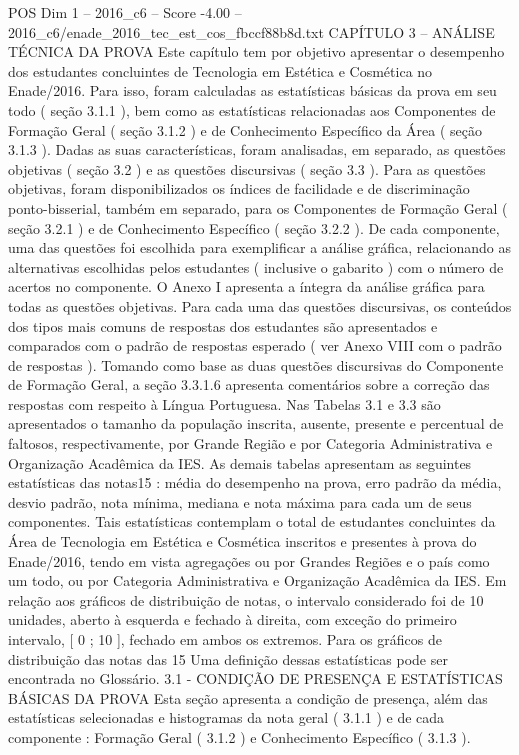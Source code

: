 \begin{textsample}{POS Dim 1 – 2016\_c6 – Score -4.00 – 2016\_c6/enade\_2016\_tec\_est\_cos\_fbccf88b8d.txt}  \label{ex:f1_pos_398}
CAPÍTULO 3 – ANÁLISE TÉCNICA DA PROVA Este capítulo tem por objetivo apresentar o desempenho dos estudantes concluintes de Tecnologia em Estética e Cosmética no Enade/2016.
Para isso, foram calculadas as estatísticas básicas da prova em seu todo ( seção 3.1.1 ), bem como as estatísticas relacionadas aos Componentes de Formação Geral ( seção 3.1.2 ) e de Conhecimento Específico da Área ( seção 3.1.3 ).
Dadas as suas características, foram analisadas, em separado, as questões objetivas ( seção 3.2 ) e as questões discursivas ( seção 3.3 ).
Para as questões objetivas, foram disponibilizados os índices de facilidade e de discriminação ponto-bisserial, também em separado, para os Componentes de Formação Geral ( seção 3.2.1 ) e de Conhecimento Específico ( seção 3.2.2 ).
De cada componente, uma das questões foi escolhida para exemplificar a análise gráfica, relacionando as alternativas escolhidas pelos estudantes ( inclusive o gabarito ) com o número de acertos no componente.
O Anexo I apresenta a íntegra da análise gráfica para todas as questões objetivas.
Para cada uma das questões discursivas, os conteúdos dos tipos mais comuns de respostas dos estudantes são apresentados e comparados com o padrão de respostas esperado ( ver Anexo VIII com o padrão de respostas ).
Tomando como base as duas questões discursivas do Componente de Formação Geral, a seção 3.3.1.6 apresenta comentários sobre a correção das respostas com respeito à Língua Portuguesa.
Nas Tabelas 3.1 e 3.3 são apresentados o tamanho da população inscrita, ausente, presente e percentual de faltosos, respectivamente, por Grande Região e por Categoria Administrativa e Organização Acadêmica da IES.
As demais tabelas apresentam as seguintes estatísticas das notas15 : média do desempenho na prova, erro padrão da média, desvio padrão, nota mínima, mediana e nota máxima para cada um de seus componentes.
Tais estatísticas contemplam o total de estudantes concluintes da Área de Tecnologia em Estética e Cosmética inscritos e presentes à prova do Enade/2016, tendo em vista agregações ou por Grandes Regiões e o país como um todo, ou por Categoria Administrativa e Organização Acadêmica da IES.
Em relação aos gráficos de distribuição de notas, o intervalo considerado foi de 10 unidades, aberto à esquerda e fechado à direita, com exceção do primeiro intervalo, [ 0 ; 10 ], fechado em ambos os extremos.
Para os gráficos de distribuição das notas das 15 Uma definição dessas estatísticas pode ser encontrada no Glossário. 3.1 - CONDIÇÃO DE PRESENÇA E ESTATÍSTICAS BÁSICAS DA PROVA Esta seção apresenta a condição de presença, além das estatísticas selecionadas e histogramas da nota geral ( 3.1.1 ) e de cada componente : Formação Geral ( 3.1.2 ) e Conhecimento Específico ( 3.1.3 ).

\end{textsample}
